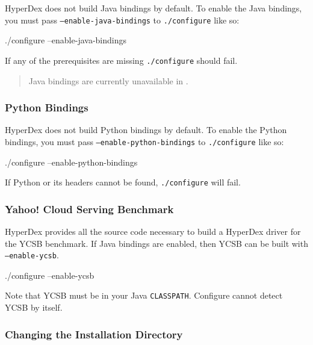 HyperDex does not build Java bindings by default.  To enable the Java bindings,
you must pass \texttt{--enable-java-bindings} to \texttt{./configure} like so:

\begin{consolecode}
./configure --enable-java-bindings
\end{consolecode}

If any of the prerequisites are missing \texttt{./configure} should fail.

\begin{quote}
Java bindings are currently unavailable in \HyperDexVersion.
\end{quote}

\subsubsection{Python Bindings}
\label{sec:installation:source:python}

HyperDex does not build Python bindings by default.  To enable the Python
bindings, you must pass \texttt{--enable-python-bindings} to
\texttt{./configure} like so:

\begin{consolecode}
./configure --enable-python-bindings
\end{consolecode}

If Python or its headers cannot be found, \texttt{./configure} will fail.

\subsubsection{Yahoo! Cloud Serving Benchmark}
\label{sec:installation:source:ycsb}

HyperDex provides all the source code necessary to build a HyperDex driver
for the YCSB benchmark.  If Java bindings are enabled, then YCSB can be built
with \texttt{--enable-ycsb}.

\begin{consolecode}
./configure --enable-ycsb
\end{consolecode}

Note that YCSB must be in your Java \texttt{CLASSPATH}.  Configure cannot detect
YCSB by itself.

\subsubsection{Changing the Installation Directory}
\label{sec:installation:source:prefix}

